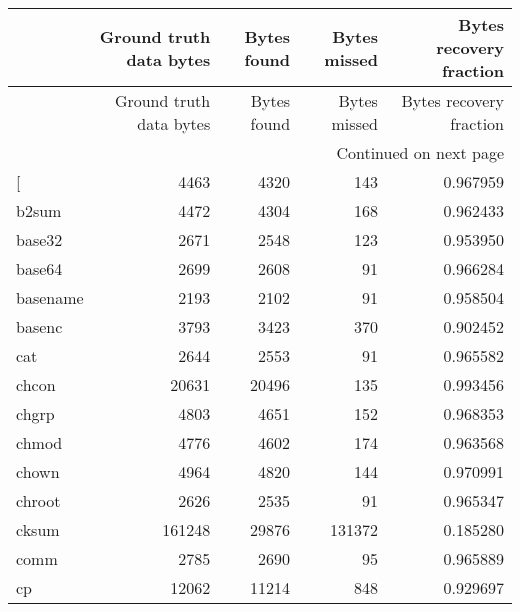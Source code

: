 \begin{longtable}{lrrrr}
\toprule
{} &  Ground truth data bytes &  Bytes found &  Bytes missed &  Bytes recovery fraction \\
\midrule
\endfirsthead

\toprule
{} &  Ground truth data bytes &  Bytes found &  Bytes missed &  Bytes recovery fraction \\
\midrule
\endhead
\midrule
\multicolumn{5}{r}{{Continued on next page}} \\
\midrule
\endfoot

\bottomrule
\endlastfoot
{[}         &                     4463 &         4320 &           143 &                 0.967959 \\
b2sum     &                     4472 &         4304 &           168 &                 0.962433 \\
base32    &                     2671 &         2548 &           123 &                 0.953950 \\
base64    &                     2699 &         2608 &            91 &                 0.966284 \\
basename  &                     2193 &         2102 &            91 &                 0.958504 \\
basenc    &                     3793 &         3423 &           370 &                 0.902452 \\
cat       &                     2644 &         2553 &            91 &                 0.965582 \\
chcon     &                    20631 &        20496 &           135 &                 0.993456 \\
chgrp     &                     4803 &         4651 &           152 &                 0.968353 \\
chmod     &                     4776 &         4602 &           174 &                 0.963568 \\
chown     &                     4964 &         4820 &           144 &                 0.970991 \\
chroot    &                     2626 &         2535 &            91 &                 0.965347 \\
cksum     &                   161248 &        29876 &        131372 &                 0.185280 \\
comm      &                     2785 &         2690 &            95 &                 0.965889 \\
cp        &                    12062 &        11214 &           848 &                 0.929697 \\

\end{longtable}
